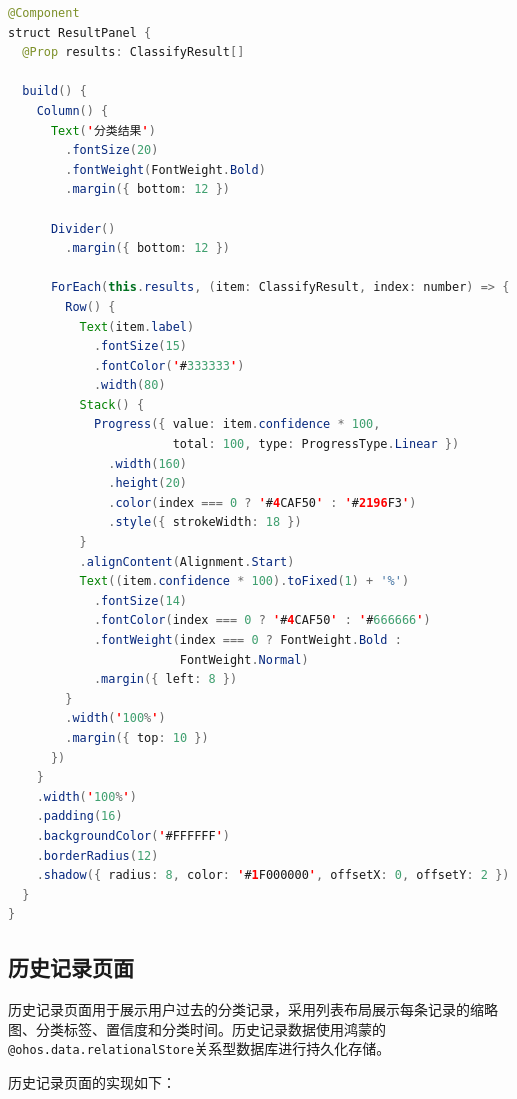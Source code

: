 \begin{lstlisting}[language=Java, caption={结果展示面板组件}]
@Component
struct ResultPanel {
  @Prop results: ClassifyResult[]

  build() {
    Column() {
      Text('分类结果')
        .fontSize(20)
        .fontWeight(FontWeight.Bold)
        .margin({ bottom: 12 })

      Divider()
        .margin({ bottom: 12 })

      ForEach(this.results, (item: ClassifyResult, index: number) => {
        Row() {
          Text(item.label)
            .fontSize(15)
            .fontColor('#333333')
            .width(80)
          Stack() {
            Progress({ value: item.confidence * 100,
                       total: 100, type: ProgressType.Linear })
              .width(160)
              .height(20)
              .color(index === 0 ? '#4CAF50' : '#2196F3')
              .style({ strokeWidth: 18 })
          }
          .alignContent(Alignment.Start)
          Text((item.confidence * 100).toFixed(1) + '%')
            .fontSize(14)
            .fontColor(index === 0 ? '#4CAF50' : '#666666')
            .fontWeight(index === 0 ? FontWeight.Bold :
                        FontWeight.Normal)
            .margin({ left: 8 })
        }
        .width('100%')
        .margin({ top: 10 })
      })
    }
    .width('100%')
    .padding(16)
    .backgroundColor('#FFFFFF')
    .borderRadius(12)
    .shadow({ radius: 8, color: '#1F000000', offsetX: 0, offsetY: 2 })
  }
}
\end{lstlisting}

\subsection{历史记录页面}

历史记录页面用于展示用户过去的分类记录，采用列表布局展示每条记录的缩略图、分类标签、置信度和分类时间。历史记录数据使用鸿蒙的\texttt{@ohos.data.relationalStore}关系型数据库进行持久化存储。

历史记录页面的实现如下：

